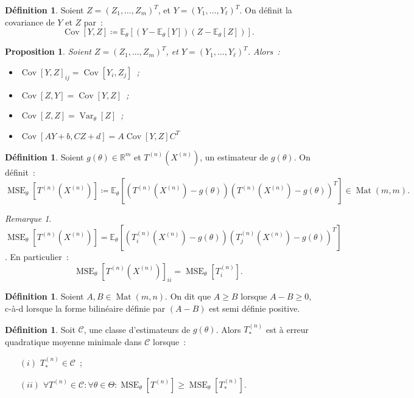 \documentclass{report}
\DeclareMathOperator{\Mat}{Mat}
\DeclareMathOperator{\Var}{Var}
\DeclareMathOperator{\Cov}{Cov}
\DeclareMathOperator{\MSE}{MSE}
\newcommand{\E}{\mathbb E}
\newcommand{\R}{\mathbb R}
\newcommand{\n}{{(n)}}
\newcommand{\Xn}{{X^\n}}
\newcommand{\Tn}{{T^\n}}
\newcommand{\TnXn}{{\Tn(\Xn)}}
\newtheorem{prp}[thm]{Proposition}
\theoremstyle{definition}
\newtheorem{déf}[thm]{Définition}
\theoremstyle{remark}
\newtheorem*{rmq}{Remarque}
\begin{document}
			\begin{déf} Soient $Z = (Z_1, \ldots, Z_m)^T$, et $Y = (Y_1, \ldots, Y_\ell)^T$. On définit la covariance de $Y$ et $Z$ par~:
			\[\Cov[Y, Z] \coloneqq \E_\theta\left[(Y-\E_\theta[Y])(Z-\E_\theta[Z])\right].\]
			\end{déf}

			\begin{prp} Soient $Z = (Z_1, \ldots, Z_m)^T$, et $Y = (Y_1, \ldots, Y_\ell)^T$. Alors~:
			\begin{itemize}
				\item $\Cov[Y, Z]_{ij} = \Cov[Y_i, Z_j]$~;
				\item $\Cov[Z, Y] = \Cov[Y, Z]$~;
				\item $\Cov[Z, Z] = \Var_\theta[Z]$~;
				\item $\Cov[AY+b, CZ+d] = A\Cov[Y, Z]C^T$
			\end{itemize}
			\end{prp}

			\begin{déf} Soient $g(\theta) \in \R^m$ et $\TnXn$, un estimateur de $g(\theta)$. On définit~:
			\[\MSE_\theta[\TnXn] \coloneqq \E_\theta\left[(\TnXn - g(\theta))(\TnXn - g(\theta))^T\right] \in \Mat(m, m).\]
			\end{déf}

			\begin{rmq} $\MSE_\theta[\TnXn] = \E_\theta\left[\left(T_i^{(n)}(\Xn)-g(\theta)\right)\left(T_j^{(n)}(\Xn)-g(\theta)\right)^T\right]$. En particulier~:
			\[\MSE_\theta[\TnXn]_{ii} = \MSE_\theta[T_i^{(n)}].\]
			\end{rmq}

			\begin{déf} Soient $A, B \in \Mat(m, n)$. On dit que $A \geq B$ lorsque $A-B \geq 0$, c-à-d lorsque la forme bilinéaire définie par $(A-B)$ est semi définie
			positive.
			\end{déf}

			\begin{déf} Soit $\mathcal C$, une classe d'estimateurs de $g(\theta)$. Alors $T_*^{(n)}$ est à erreur quadratique moyenne minimale dans $\mathcal C$
			lorsque~:
			\begin{itemize}
				\item[$(i)$]  $T_*^{(n)} \in \mathcal C$~;
				\item[$(ii)$] $\forall \Tn \in \mathcal C : \forall \theta \in \Theta : \MSE_\theta[\Tn] \geq \MSE_\theta[T_*^{(n)}]$.
			\end{itemize}
			\end{déf}
\end{document}
